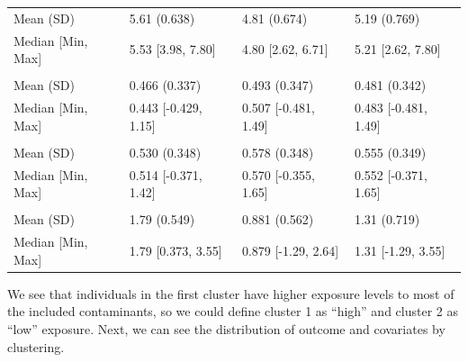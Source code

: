 \documentclass[
]{book}
\begin{document}
\begin{tabular}[t]{llll}
\hspace{1em}Mean (SD) & 5.61 (0.638) & 4.81 (0.674) & 5.19 (0.769)\\
\hspace{1em}Median [Min, Max] & 5.53 [3.98, 7.80] & 4.80 [2.62, 6.71] & 5.21 [2.62, 7.80]\\
\addlinespace[0.3em]
\multicolumn{4}{l}{\textbf{x12}}\\
\hspace{1em}Mean (SD) & 0.466 (0.337) & 0.493 (0.347) & 0.481 (0.342)\\
\hspace{1em}Median [Min, Max] & 0.443 [-0.429, 1.15] & 0.507 [-0.481, 1.49] & 0.483 [-0.481, 1.49]\\
\addlinespace[0.3em]
\multicolumn{4}{l}{\textbf{x13}}\\
\hspace{1em}Mean (SD) & 0.530 (0.348) & 0.578 (0.348) & 0.555 (0.349)\\
\hspace{1em}Median [Min, Max] & 0.514 [-0.371, 1.42] & 0.570 [-0.355, 1.65] & 0.552 [-0.371, 1.65]\\
\addlinespace[0.3em]
\multicolumn{4}{l}{\textbf{x14}}\\
\hspace{1em}Mean (SD) & 1.79 (0.549) & 0.881 (0.562) & 1.31 (0.719)\\
\hspace{1em}Median [Min, Max] & 1.79 [0.373, 3.55] & 0.879 [-1.29, 2.64] & 1.31 [-1.29, 3.55]\\
\bottomrule
\end{tabular}

We see that individuals in the first cluster have higher exposure levels to most of the included contaminants, so we could define cluster 1 as ``high'' and cluster 2 as ``low'' exposure. Next, we can see the distribution of outcome and covariates by clustering.
\end{document}
